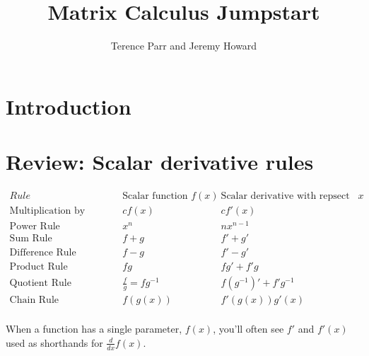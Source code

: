 \documentclass[11pt]{article}
\title{Matrix Calculus Jumpstart}
\author{Terence Parr and Jeremy Howard}
\newcommand{\cut}[1]{}
\begin{document}
\maketitle

\section{Introduction}

\cut{
three-dimensional coordinates in room yielding a temperature. then can yield temperature and noise or humidity or light.  Sheldon Cooper: you're in my spot.

$\Delta x$ gives what $\Delta y$? rise/run to determine derivative.

neural net equation. optimizing it and calculus comes lurching back into your life like distant relatives around the holidays.

 lots of good cheat sheets like https://www.math.uwaterloo.ca/~hwolkowi/matrixcookbook.pdf and slides like https://www.comp.nus.edu.sg/~cs5240/lecture/matrix-differentiation.pdf
 
given any particular formula, you can reduce it to its scalar form and use the typical scalar derivative to come up with the formula. That can be tedious and error-prone. It's better to learn the matrix/vector derivatives and apply transformations to get the derivative.
}

\section{Review: Scalar derivative rules}

$
\begin{array}{lcc}
Rule & \text{Scalar function } f(x) & \text{Scalar derivative with repsect to } x\\
\hline
\text{Multiplication by constant} &	cf(x)	&cf'(x)\\
\text{Power Rule}	& x^n	& nx^{n-1}\\
\text{Sum Rule}	& f + g	& f' + g'\\
\text{Difference Rule}	& f - g	& f' - g'\\
\text{Product Rule}	& fg & f g' + f' g\\
\text{Quotient Rule}	& \frac{f}{g} = fg^{-1} & f (g^{-1})' + f' g^{-1}\\
\text{Chain Rule}	 & f(g(x)) &   f'(g(x))g'(x)\\
\end{array}
$

When a function has a single parameter, $f(x)$, you'll often see $f'$ and $f'(x)$ used as shorthands for $\frac{d}{dx} f(x)$.  
\end{document}
